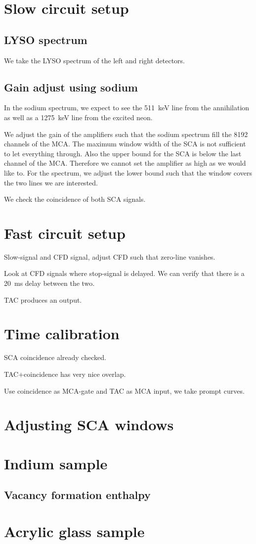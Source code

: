 \documentclass[11pt, english, fleqn, DIV=15, headinclude, BCOR=2cm]{scrreprt}
\begin{document}
\section{Slow circuit setup}

\subsection{LYSO spectrum}

We take the LYSO spectrum of the left and right detectors.

\subsection{Gain adjust using sodium}

In the sodium spectrum, we expect to see the \SI{511}{\kilo\electronvolt} line
from the annihilation as well as a \SI{1275}{\kilo\electronvolt} line from the
excited neon.

We adjust the gain of the amplifiers such that the sodium spectrum fill the
8192 channels of the MCA\@. The maximum window width of the SCA is not
sufficient to let everything through. Also the upper bound for the SCA is below
the last channel of the MCA\@. Therefore we cannot set the amplifier as high as
we would like to. For the spectrum, we adjust the lower bound such that the
window covers the two lines we are interested.

We check the coincidence of both SCA signals.

\section{Fast circuit setup}

Slow-signal and CFD signal, adjust CFD such that zero-line vanishes.

Look at CFD signals where stop-signal is delayed. We can verify that there is a
\SI{20}{\milli\second} delay between the two.

TAC produces an output.

\section{Time calibration}

SCA coincidence already checked.

TAC+coincidence has very nice overlap.

Use coincidence as MCA-gate and TAC as MCA input, we take prompt curves.

\section{Adjusting SCA windows}

\section{Indium sample}

\subsection{Vacancy formation enthalpy}

\section{Acrylic glass sample}
\end{document}
